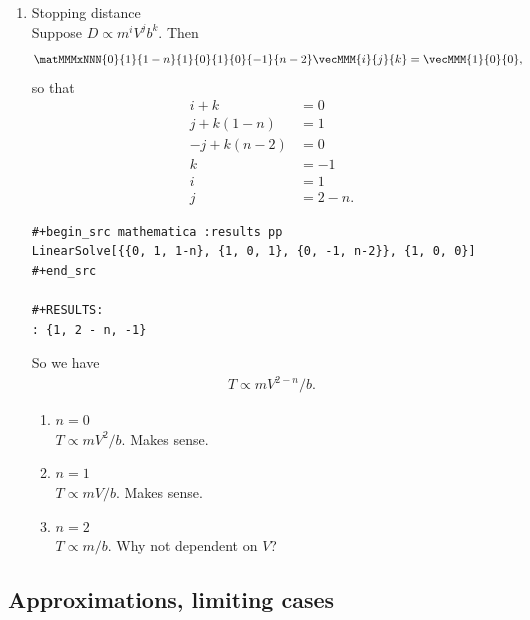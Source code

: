 \begin{enumerate}[label=(\alph*)]
\item Stopping distance\\
  Suppose $D \propto m^iV^jb^k$. Then
  \begin{align*}
    \matMMMxNNN
    {0}{1}{1-n}
    {1}{0}{1}
    {0}{-1}{n-2} \vecMMM{i}{j}{k} &= \vecMMM{1}{0}{0},
  \end{align*}
  so that
  \begin{align*}
    i + k &= 0 \\
    j + k(1 - n) &= 1 \\
    -j + k(n - 2) &= 0 \\
    k &= -1 \\
    i &= 1 \\
    j &= 2 - n.
  \end{align*}

\begin{verbatim}
#+begin_src mathematica :results pp
LinearSolve[{{0, 1, 1-n}, {1, 0, 1}, {0, -1, n-2}}, {1, 0, 0}]
#+end_src

#+RESULTS:
: {1, 2 - n, -1}
\end{verbatim}

  So we have
  \begin{align*}
    T \propto mV^{2 - n}/b.
  \end{align*}

  \begin{enumerate}
  \item $n = 0$\\
    $T \propto mV^2/b$. Makes sense.
  \item $n = 1$\\
    $T \propto mV/b$. Makes sense.
  \item $n = 2$\\
    $T \propto m/b$. Why not dependent on $V$?
  \end{enumerate}
\end{enumerate}

\subsection*{Approximations, limiting cases}

